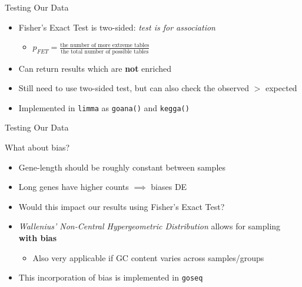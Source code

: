\documentclass[aspectratio=169,11pt]{beamer}
\begin{document}
\begin{frame}{Testing Our Data}

	\begin{itemize}
		\item Fisher's Exact Test is two-sided: \textit{test is for association}
		\begin{itemize}
			\item $p_{FET} = \frac{\text{the number of more extreme tables}}{\text{the total number of possible tables}}$
		\end{itemize}
		\item Can return results which are \textbf{not} enriched
		\item Still need to use two-sided test, but can also check the observed $>$ expected
		\item Implemented in \texttt{limma} as \texttt{goana()} and \texttt{kegga()}
	\end{itemize}	
	
\end{frame}

\begin{frame}{Testing Our Data}

What about bias?

	\begin{itemize}
		\item Gene-length should be roughly constant between samples
		\item Long genes have higher counts $\implies$ biases DE
		\item Would this impact our results using Fisher's Exact Test?
		\pause
		\item \textit{Wallenius' Non-Central Hypergeometric Distribution} allows for sampling \textbf{with bias}
		\begin{itemize}
			\item Also very applicable if GC content varies across samples/groups
		\end{itemize}
		\item This incorporation of bias is implemented in \texttt{goseq}
	\end{itemize}	
	
\end{frame}
\end{document}
